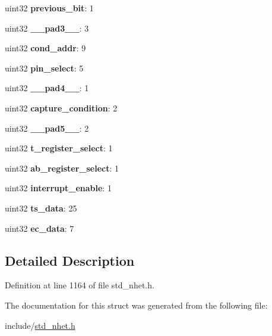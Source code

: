 \begin{DoxyCompactItemize}
\item 
\mbox{\label{structwcape__format_a1a5d821e3ca9d94626c7022fe06bb921}} 
uint32 {\bfseries previous\+\_\+bit}\+: 1
\item 
\mbox{\label{structwcape__format_a6159078ee541966601b674ec27dee8b3}} 
uint32 {\bfseries \+\_\+\+\_\+pad3\+\_\+\+\_\+}\+: 3
\item 
\mbox{\label{structwcape__format_a120494f5c5680c4595262a6e001180ea}} 
uint32 {\bfseries cond\+\_\+addr}\+: 9
\item 
\mbox{\label{structwcape__format_ad950cbf9f5f34d144453553241baabc5}} 
uint32 {\bfseries pin\+\_\+select}\+: 5
\item 
\mbox{\label{structwcape__format_a70eefe64ffbd2ad643f84ceb60583237}} 
uint32 {\bfseries \+\_\+\+\_\+pad4\+\_\+\+\_\+}\+: 1
\item 
\mbox{\label{structwcape__format_a914d00fec1a5e34a8f7f9c15d9047e81}} 
uint32 {\bfseries capture\+\_\+condition}\+: 2
\item 
\mbox{\label{structwcape__format_a376c551609600c9c831d3488133281e4}} 
uint32 {\bfseries \+\_\+\+\_\+pad5\+\_\+\+\_\+}\+: 2
\item 
\mbox{\label{structwcape__format_a3b1c7b9612829e91846ee8b3d31dc3ec}} 
uint32 {\bfseries t\+\_\+register\+\_\+select}\+: 1
\item 
\mbox{\label{structwcape__format_a85daf0c28ab2037a9569e62b30e699e0}} 
uint32 {\bfseries ab\+\_\+register\+\_\+select}\+: 1
\item 
\mbox{\label{structwcape__format_a647e775a59bcf5e18b24115dc374f171}} 
uint32 {\bfseries interrupt\+\_\+enable}\+: 1
\item 
\mbox{\label{structwcape__format_a40e1d7ba9599a26897f3194f863378d4}} 
uint32 {\bfseries ts\+\_\+data}\+: 25
\item 
\mbox{\label{structwcape__format_a10c61312d1d0e2d06465991740c0bede}} 
uint32 {\bfseries ec\+\_\+data}\+: 7
\end{DoxyCompactItemize}


\subsection{Detailed Description}


Definition at line 1164 of file std\+\_\+nhet.\+h.



The documentation for this struct was generated from the following file\+:\begin{DoxyCompactItemize}
\item 
include/\mbox{\hyperlink{std__nhet_8h}{std\+\_\+nhet.\+h}}\end{DoxyCompactItemize}
